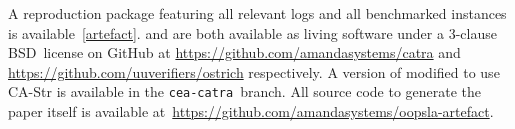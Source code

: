 A reproduction package featuring all relevant logs and all benchmarked instances is available~\cref{artefact}.
\Ostrich{} and \Catra{} are both available as living software
under a 3-clause BSD~license on GitHub at \url{https://github.com/amandasystems/catra} and \url{https://github.com/uuverifiers/ostrich}
respectively. A version of \Ostrich{} modified to use CA-Str is available in the \texttt{cea-catra}~branch. All source code to generate the paper itself
is available at~\url{https://github.com/amandasystems/oopsla-artefact}.
